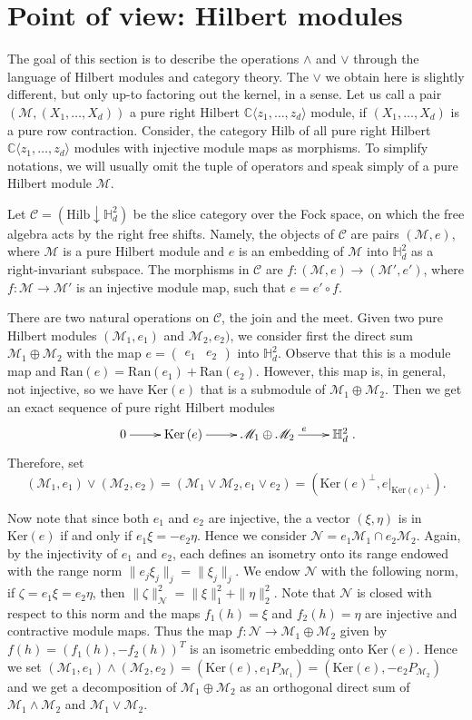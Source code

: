 \documentclass[11pt]{article}
\def\C{\mathbb{C}}
\def\bH{\mathbb{H}}
\newcommand{\ran}[1]{\ensuremath{\mathrm{Ran} \left( {#1} \right) }}
\renewcommand{\ker}[1]{\ensuremath{\mathrm{Ker} \left( {#1} \right) }}
\newcommand{\hilbmod}{\ensuremath{\mathrm{Hilb}}}
\newcommand{\cC}{\ensuremath{\mathcal{C}}}
\newcommand{\sM}{\ensuremath{\mathscr{M}}}
\newcommand{\sN}{\ensuremath{\mathscr{N}}}
\numberwithin{equation}{section}
\numberwithin{subsection}{section}
\theoremstyle{definition}
\begin{document}
\section{Point of view: Hilbert modules}



The goal of this section is to describe the operations $\wedge$ and $\vee$ through the language of Hilbert modules and category theory. The $\vee$ we obtain here is slightly different, but only up-to factoring out the kernel, in a sense. Let us call a pair $(\sM,(X_1,\ldots,X_d))$ a pure right Hilbert $\C \langle z_1,\ldots,z_d\rangle$ module, if $(X_1,\ldots,X_d)$ is a pure row contraction. Consider, the category $\hilbmod$ of all pure right Hilbert $\C \langle z_1,\ldots,z_d\rangle$ modules with injective module maps as morphisms. To simplify notations, we will usually omit the tuple of operators and speak simply of a pure Hilbert module $\sM$.

Let $\cC = (\hilbmod \downarrow \bH^2_d)$ be the slice category over the Fock space, on which the free algebra acts by the right free shifts. Namely, the objects of $\cC$ are pairs $(\sM, e)$, where $\sM$ is a pure Hilbert module and $e$ is an embedding of $\sM$ into $\bH^2_d$ as a right-invariant subspace. The morphisms in $\cC$ are $f \colon (\sM,e) \to (\sM',e')$, where $f \colon \sM \to \sM'$ is an injective module map, such that $e = e' \circ f$.

There are two natural operations on $\cC$, the join and the meet. Given two pure Hilbert modules $(\sM_1,e_1)$ and $\sM_2, e_2)$, we consider first the direct sum $\sM_1 \oplus \sM_2$ with the map $e =\left(\begin{smallmatrix} e_1 & e_2 \end{smallmatrix} \right)$ into $\bH^2_d$. Observe that this is a module map and $\ran{e} = \ran{e_1} + \ran{e_2}$. However, this map is, in general, not injective, so we have $\ker{e}$ that is a submodule of $\sM_1 \oplus \sM_2$. Then we get an exact sequence of pure right Hilbert modules
\[
\xymatrix{0 \ar[r] & \ker{e} \ar[r] & \sM_1 \oplus \sM_2 \ar[r]^{e} & \bH^2_d}.
\]
Therefore, set $$(\sM_1,e_1) \vee (\sM_2,e_2) = (\sM_1 \vee \sM_2, e_1 \vee e_2) = (\ker{e}^{\perp},e|_{\ker{e}^{\perp}}).$$

Now note that since both $e_1$ and $e_2$ are injective, the a vector $(\xi, \eta)$ is in $\ker{e}$ if and only if $e_1 \xi = - e_2 \eta$. Hence we consider $\sN = e_1 \sM_1 \cap e_2 \sM_2$. Again, by the injectivity of $e_1$ and $e_2$, each defines an isometry onto its range endowed with the range norm $\|e_j \xi_j\|_j = \|\xi_j\|_j$. We endow $\sN$ with the following norm, if $\zeta= e_1 \xi = e_2 \eta$, then $\|\zeta\|_{\sN}^2 = \| \xi \|_1^2 + \|\eta\|_2^2$. Note that $\sN$ is closed with respect to this norm and the maps $f_1(h) = \xi$ and $f_2(h) = \eta$ are injective and contractive module maps. Thus the map $f \colon \sN \to \sM_1 \oplus \sM_2$ given by $f(h) = (f_1(h), -f_2(h))^T$ is an isometric embedding onto $\ker{e}$. Hence we set $(\sM_1,e_1) \wedge (\sM_2,e_2) = (\ker{e},e_1 P_{\sM_1}) = (\ker{e},-e_2 P_{\sM_2})$ and we get a decomposition of $\sM_1 \oplus \sM_2$ as an orthogonal direct sum of $\sM_1 \wedge \sM_2$ and $\sM_1 \vee \sM_2$. 
\end{document}
